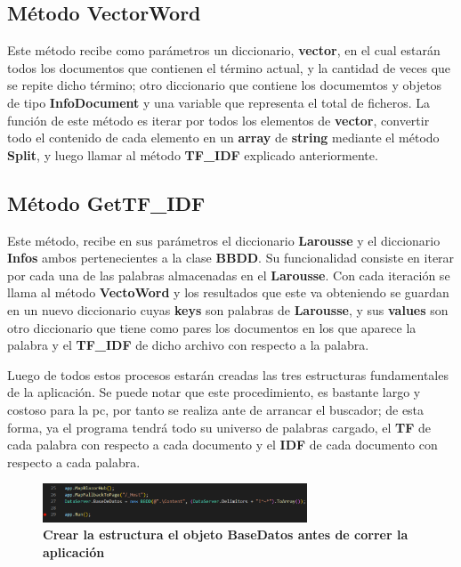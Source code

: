 \documentclass[10pt,a4paper]{article}
\begin{document}
\subsection{M\'etodo VectorWord}
\setlength{\parindent}{1em} Este m\'etodo recibe como par\'ametros un diccionario, \textbf{vector}, en el cual estar\'an todos los documentos que contienen el t\'ermino actual, y la cantidad de veces que se repite dicho t\'ermino; otro diccionario que contiene los documemtos y objetos de tipo \textbf{InfoDocument} y una variable que representa el total de ficheros. La funci\'on de este m\'etodo es iterar por todos los elementos de \textbf{vector}, convertir todo el contenido de cada elemento en un \textbf{array} de \textbf{string} mediante el m\'etodo \textbf{Split}, y luego llamar al m\'etodo \textbf{TF\_IDF} explicado anteriormente.

\subsection{M\'etodo GetTF\_IDF}
\setlength{\parindent}{1em} Este m\'etodo, recibe en sus par\'ametros el diccionario \textbf{Larousse} y el diccionario \textbf{Infos} ambos pertenecientes a la clase \textbf{BBDD}. Su funcionalidad consiste en iterar por cada una de las palabras almacenadas en el \textbf{Larousse}. Con cada iteraci\'on se llama al m\'etodo \textbf{VectoWord} y los resultados que este va obteniendo se guardan en un nuevo diccionario cuyas  \textbf{keys} son  palabras de \textbf{Larousse}, y sus \textbf{values} son otro diccionario que tiene como pares los documentos en los que aparece la palabra y el \textbf{TF\_IDF} de dicho archivo con respecto a la palabra.

\setlength{\parindent}{1em} Luego de todos estos procesos estar\'an creadas las tres estructuras fundamentales de la aplicaci\'on. Se puede notar que este procedimiento, es bastante largo y costoso para la pc, por tanto se realiza ante de arrancar el buscador; de esta forma, ya el programa tendr\'a todo su universo de palabras cargado, el \textbf{TF} de cada palabra con respecto a cada documento y el \textbf{IDF} de cada documento con respecto a cada palabra.
\begin{figure}[!h]
\centering
\includegraphics[width = 0.7\textwidth]{Comienzo de la APP.png}
\caption{\textbf{Crear la estructura el objeto BaseDatos antes de correr la aplicaci\'on}}
\end{figure}
\end{document}
